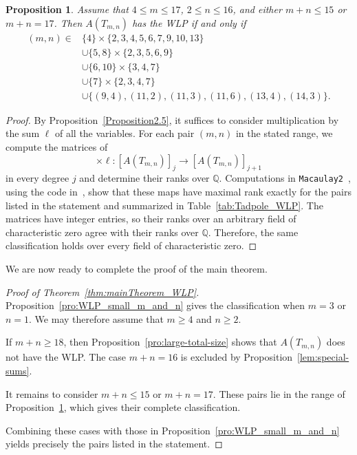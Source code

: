\documentclass[12pt,twoside]{amsart}
\newtheorem{proposition}[thm]{Proposition}
\theoremstyle{definition}
\theoremstyle{mystyle}
\begin{document}
\begin{proposition}\label{pro:remaining-computational-cases}
Assume that $4\leq m\leq17$, $2\leq n\leq16$, and either
$m+n\leq15$ or $m+n=17$. Then $A(T_{m,n})$ has the WLP if and only if
\begin{align*}
(m,n)\in{}&
\{4\}\times\{2,3,4,5,6,7,9,10,13\}\\
&\cup\{5,8\}\times\{2,3,5,6,9\}\\
&\cup\{6,10\}\times\{3,4,7\}\\
&\cup\{7\}\times\{2,3,4,7\}\\
&\cup\{(9,4),(11,2),(11,3),(11,6),(13,4),(14,3)\}.
\end{align*}
\end{proposition}

\begin{proof}
By Proposition~\ref{Proposition2.5}, it suffices to consider
multiplication by the sum $\ell$ of all the variables. For each pair
$(m,n)$ in the stated range, we compute the matrices of
\begin{equation*}
\times\ell:
[A(T_{m,n})]_j\longrightarrow[A(T_{m,n})]_{j+1}
\end{equation*}
in every degree $j$ and determine their ranks over $\mathbb{Q}$.
Computations in \texttt{Macaulay2}~\cite{GS}, using the code
in~\cite{HPS26M2}, show that these maps have maximal rank exactly for
the pairs listed in the statement and summarized in
Table~\ref{tab:Tadpole_WLP}.
The matrices have integer entries, so their ranks over an arbitrary
field of characteristic zero agree with their ranks over
$\mathbb{Q}$. Therefore, the same classification holds over every
field of characteristic zero.
\end{proof}
We are now ready to complete the proof of the main theorem.

\begin{proof}[Proof of Theorem~\ref{thm:mainTheorem_WLP}]
	Proposition~\ref{pro:WLP_small_m_and_n} gives the
	classification when $m=3$ or $n=1$. We may therefore
	assume that $m\geq4$ and $n\geq2$.
	
	If $m+n\geq18$, then
	Proposition~\ref{pro:large-total-size} shows that
	$A(T_{m,n})$ does not have the WLP.
	The case $m+n=16$ is excluded by
	Proposition~\ref{lem:special-sums}.
	
	It remains to consider $m+n\leq15$ or $m+n=17$.
	These pairs lie in the range of
	Proposition~\ref{pro:remaining-computational-cases},
	which gives their complete classification.
	
	Combining these cases with those in
	Proposition~\ref{pro:WLP_small_m_and_n} yields precisely
	the pairs listed in the statement.
\end{proof}
\end{document}
